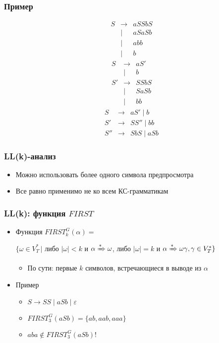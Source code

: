 \documentclass{beamer}
\newcommand{\derive}[0]{\xRightarrow[]{*}}
\begin{document}
\begin{frame}[fragile]
  \transwipe[direction=90]
  \frametitle{Пример}
  \[
  \begin{array}{crcl}
  &S& \to & a S S b S \\
  & &           | & a S a S b \\
  & &           | & a b b \\
  & &           | & b 
  \end{array}
  \]
 \pause
  \[
  \begin{array}{crcl}
  &S & \to & a S' \\
  &  &           | & b \\
  
  &S'& \to & S S b S \\
  &  &           | & S a S b \\
  &  &           | & b b 
  \end{array}
  \]
  \pause
  \[
  \begin{array}{crcl}
  &S  & \to & a S' \mid b \\
  
  &S' & \to & S S'' \mid b b \\
  
  &S''& \to & S b S \mid a S b 
  \end{array}
  \]
\end{frame}


\begin{frame}[fragile]
  \transwipe[direction=90]
  \frametitle{LL(k)-анализ}

  \begin{itemize}
    \item Можно использовать более одного символа предпросмотра 
    \item Все равно применимо не ко всем КС-грамматикам
  \end{itemize}

\end{frame}



\begin{frame}[fragile]
  \transwipe[direction=90]
  \frametitle{LL(k): функция $FIRST$}
  \begin{itemize}
      \item Функция $FIRST^G_k(\alpha) = $
      
      $\{ \omega \in V_T^* \, |$ либо $|\omega| < k$ и $ \alpha \derive \omega$, либо $|\omega| = k$ и $\alpha \derive \omega \gamma, \gamma \in V_T^*\}$
      \begin{itemize}
        \item По сути: первые $k$ символов, встречающиеся в выводе из $\alpha$
      \end{itemize}
      \item Пример
      \begin{itemize}
        \item $S \to S S \mid a S b \mid \varepsilon$
        \item $FIRST^G_3( a S b ) = \{ ab, aab, aaa\} $
        \item $aba \notin FIRST^G_3 (a S b)$!
      \end{itemize}    
  \end{itemize}
\end{frame}
\end{document}
